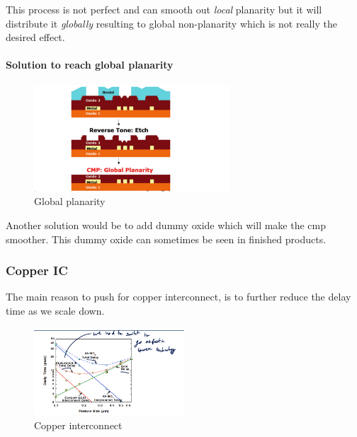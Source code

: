 \documentclass[
]{article}
\begin{document}
This process is not perfect and can smooth out \emph{local} planarity
but it will distribute it \emph{globally} resulting to global
non-planarity which is not really the desired effect.

\hypertarget{solution-to-reach-global-planarity}{%
\paragraph{Solution to reach global
planarity}\label{solution-to-reach-global-planarity}}

\begin{figure}
\hypertarget{fig:enter-label}{%
\centering
\includegraphics[width=0.65\textwidth,height=\textheight]{global_planarity.png}
\caption{Global planarity}\label{fig:enter-label}
}
\end{figure}

Another solution would be to add dummy oxide which will make the {cmp}
smoother. This dummy oxide can sometimes be seen in finished products.

\hypertarget{copper-ic}{%
\subsubsection{Copper IC}\label{copper-ic}}

The main reason to push for copper interconnect, is to further reduce
the delay time as we scale down.

\begin{figure}
\hypertarget{fig:enter-label}{%
\centering
\includegraphics[width=0.5\textwidth,height=\textheight]{copper_ic.png}
\caption{Copper interconnect}\label{fig:enter-label}
}
\end{figure}
\end{document}
